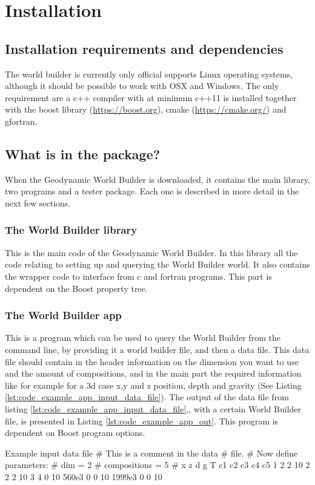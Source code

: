 \documentclass{book}
\newcommand{\GWB}{{Geodynamic World Builder}}
\newcommand{\WB}{{World Builder}}
\newcommand{\boost}{{Boost}}
\newcommand{\cmake}{{cmake}}
\begin{document}
\chapter{Installation}
\section{Installation requirements and dependencies}
\label{section:dependencies}
The world builder is currently only official supports Linux operating systems, although it should be possible to work with OSX and Windows. The only requirement are a c++ compiler with at minimum c++11 is installed together with the boost library (\url{https://boost.org}), \cmake{} (\url{https://cmake.org/}) and gfortran. 


\section{What is in the package?}
\label{section:in_package}
When the \GWB{} is downloaded, it contains the main library, two programs and a tester package. Each one is described in more detail in the next few sections.
\subsection{The World Builder library}
This is the main code of the \GWB{}. In this library all the code relating to setting up and querying the \WB{} world. It also contains the wrapper code to interface from c and fortran programs. This part is dependent on the \boost{} property tree. 

\subsection{The World Builder app}
This is a program which can be used to query the \WB{} from the command line, by providing it a world builder file, and then a data file. This data file should contain in the header information on the dimension you want to use and the amount of compositions, and in the main part the required information like for example for a 3d case x,y and z position, depth and gravity (See Listing \ref{lst:code_example_app_input_data_file}). The output of the data file from listing \ref{lst:code_example_app_input_data_file},, with a certain \WB{} file, is presented in Listing \ref{lst:code_example_app_out}. This program is dependent on \boost{} program options.

\begin{bashcode}[label={lst:code_example_app_input_data_file}]{Example input data file}
# This is a comment in the data
# file. 
# Now define parameters:
# dim = 2
# compositions = 5
# x      z d g  T c1 c2 c3 c4 c5
  1      2 2 10
  2      2 2 10
  3      4 0 10
  560e3  0 0 10
  1999e3 0 0 10
\end{bashcode}
\end{document}
